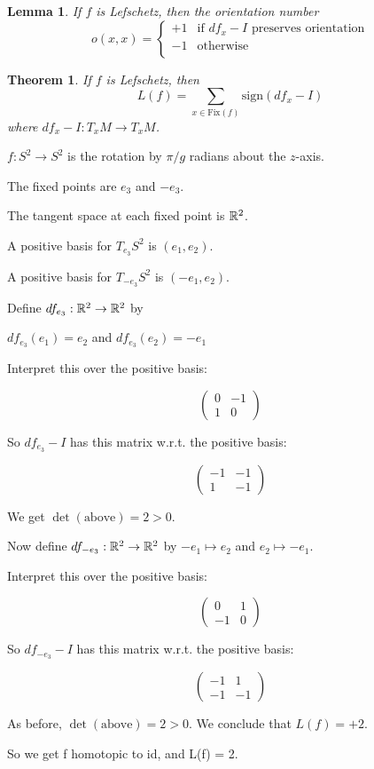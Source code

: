 \documentclass[11pt]{amsbook}
\theoremstyle{mystyle} \newtheorem{thrm}[thm]{Theorem}
\theoremstyle{mystyle} \newtheorem{defi}[thm]{Definition}
\theoremstyle{mystyle} \newtheorem{coro}[thm]{Corollary}
\theoremstyle{mystyle} \newtheorem{propo}[thm]{Proposition}
\theoremstyle{mystyle} \newtheorem{lemm}[thm]{Lemma}
\numberwithin{thm}{section}
\newcommand{\Fix}{\text{Fix}}
\begin{document}
\begin{lemm}
	If $f$ is Lefschetz, then the orientation number
	$$o(x,x) =
	\begin{cases}
		+1 &\text{if $df_x - I$ preserves orientation} \\
		-1 &\text{otherwise} \\
	\end{cases}$$
\end{lemm}
\begin{thrm}
	If $f$ is Lefschetz, then $$L(f) = \sum_{x \in \Fix(f)} \text{sign}(df_x - I)$$ where $df_x - I : T_xM \overset{~}{\to} T_xM$.
\end{thrm}
\begin{example}
	$f : S^2 \to S^2$ is the rotation by $\pi/g$ radians about the $z$-axis.

	The fixed points are $e_3$ and $-e_3$.

	The tangent space at each fixed point is ${\mathbb R}^2$.

	A positive basis for $T_{e_3}S^2$ is $(e_1, e_2)$.

	A positive basis for $T_{-e_3}S^2$ is $(-e_1, e_2)$.

	Define $df_{e_3} : {\mathbb R}^2 \to {\mathbb R}^2$ by

	$df_{e_3}(e_1) = e_2$ and $df_{e_3}(e_2) = -e_1$

	Interpret this over the positive basis:

	$$\begin{pmatrix}
	0 & -1 \\
	1 & 0
	\end{pmatrix}$$

	So $df_{e_3} - I$ has this matrix w.r.t. the positive basis:

	$$\begin{pmatrix}
	-1 & -1 \\
	1 & -1
	\end{pmatrix}$$

	We get $\det(\text{above}) = 2 > 0$.

	Now define $df_{-e_3} : {\mathbb R}^2 \to {\mathbb R}^2$ by
	$-e_1 \mapsto e_2$ and
	$e_2 \mapsto -e_1$.

	Interpret this over the positive basis:

	$$\begin{pmatrix}
	0 & 1 \\
	-1 & 0
	\end{pmatrix}$$

	So $df_{-e_3} - I$ has this matrix w.r.t. the positive basis:

	$$\begin{pmatrix}
	-1 & 1 \\
	-1 & -1
	\end{pmatrix}$$

	As before, $\det(\text{above}) = 2 > 0$. We conclude that $L(f) = +2$.

	So we get f homotopic to id, and L(f) = 2.
\end{example}
\end{document}

